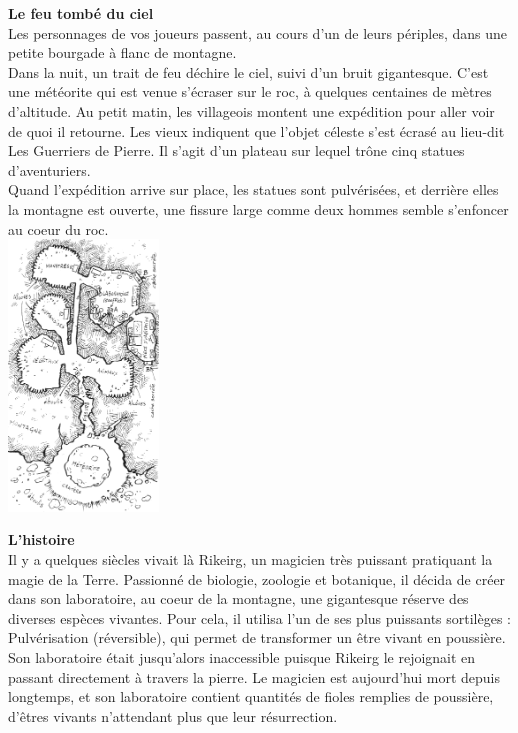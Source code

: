 \documentclass[11pt,twoside,a4paper]{article}
\begin{document}
\begin{multicols}{3}
\footnotesize{

\textbf{Le feu tomb{\'e} du ciel}~\\
Les personnages de vos joueurs passent, au cours d'un de leurs p{\'e}riples, dans une petite bourgade {\`a} flanc de montagne.~\\

Dans la nuit, un trait de feu d{\'e}chire le ciel, suivi d'un bruit gigantesque. C'est une m{\'e}t{\'e}orite qui est venue s'{\'e}craser sur le roc, {\`a} quelques centaines de m{\`e}tres d'altitude. Au petit matin, les villageois montent une exp{\'e}dition pour aller voir de quoi il retourne. Les vieux indiquent que l'objet c{\'e}leste s'est {\'e}cras{\'e} au lieu-dit Les Guerriers de Pierre. Il s'agit d'un plateau sur lequel tr{\^o}ne cinq statues d'aventuriers.~\\

Quand l'exp{\'e}dition arrive sur place, les statues sont pulv{\'e}ris{\'e}es, et derri{\`e}re elles la montagne est ouverte, une fissure large comme deux hommes semble s'enfoncer au coeur du roc.~\\

\includegraphics[width=0.30\textwidth]{img/planLaboratoireMaitreRikeirg.jpg}

\textbf{L'histoire}~\\

Il y a quelques si{\`e}cles vivait l{\`a} Rikeirg, un magicien tr{\`e}s puissant pratiquant la magie de la Terre. Passionn{\'e} de biologie, zoologie et botanique, il d{\'e}cida de cr{\'e}er dans son laboratoire, au coeur de la montagne, une gigantesque r{\'e}serve des diverses esp{\`e}ces vivantes. Pour cela, il utilisa l'un de ses plus puissants sortil{\`e}ges : Pulv{\'e}risation (r{\'e}versible), qui permet de transformer un {\^e}tre vivant en poussi{\`e}re. Son laboratoire {\'e}tait jusqu'alors inaccessible puisque Rikeirg le rejoignait en passant directement {\`a} travers la pierre. Le magicien est aujourd'hui mort depuis longtemps, et son laboratoire contient quantit{\'e}s de fioles remplies de poussi{\`e}re, d'{\^e}tres vivants n'attendant plus que leur r{\'e}surrection.~\\

}
\end{multicols}
\end{document}
